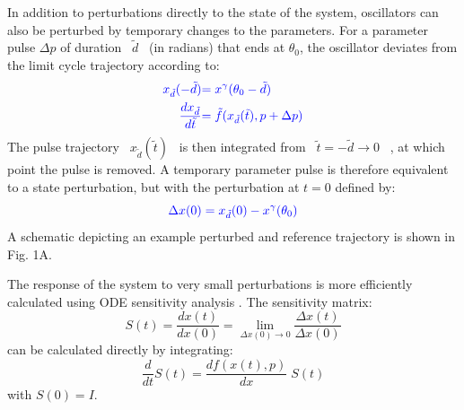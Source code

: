\documentclass[11pt, letterpaper]{article}
\providecommand{\DIFadd}[1]{{\protect\color{blue}#1}} %
\providecommand{\DIFaddbegin}{} %
\providecommand{\DIFaddend}{} %
\begin{document}
In addition to perturbations directly to the state of the system, oscillators can also be perturbed by temporary changes to the parameters.
For a parameter pulse $\Delta p$ of duration \DIFaddbegin \DIFadd{\mbox{%
$\tilde{d}$
}%
}\DIFaddend (in radians) \DIFaddbegin \DIFadd{that }\DIFaddend ends at $\theta_0$, the oscillator deviates from the limit cycle trajectory according to:
\DIFaddbegin \begin{align}\DIFadd{
  x_{\tilde{d}}(-\tilde{d}) }&\DIFadd{= x^\gamma(\theta_0 - \tilde{d}) }\\
  \DIFadd{\frac{dx_{\tilde{d}}}{d\tilde{t}} }&\DIFadd{= \tilde{f}(x_{\tilde{d}}(\tilde{t}), p + \Delta p) \label{eq:ode_pert}
}\end{align}
\DIFaddend The pulse trajectory \DIFaddbegin \DIFadd{\mbox{%
$x_{\tilde{d}}(\tilde{t})$
}%
}\DIFaddend is then integrated from \DIFaddbegin \DIFadd{\mbox{%
$\tilde{t} = -\tilde{d} \to 0$
}%
}\DIFaddend , at which point the pulse is removed.
A temporary parameter pulse is therefore equivalent to a state perturbation, but with the perturbation at $t = 0$ defined by:
\DIFaddbegin \begin{equation}\DIFadd{
  \Delta x(0) = x_{\tilde{d}}(0) - x^\gamma(\theta_0)
}\end{equation}
\DIFaddend A schematic depicting an example perturbed and reference trajectory is shown in Fig. 1A.

The response of the system to very small perturbations is more efficiently calculated using ODE sensitivity analysis \cite{Rabitz1983}.
The sensitivity matrix\DIFaddbegin \DIFadd{:
}\DIFaddend \begin{equation}
  S(t) = \frac{dx(t)}{dx(0)} = \lim_{\Delta x(0) \to 0}\frac{\Delta x(t)}{\Delta x(0)}
  \label{eq:senslimit}
\end{equation}
can be calculated directly by integrating\DIFaddbegin \DIFadd{:
}\DIFaddend \begin{equation}
  \frac{d}{dt} S(t)  = \frac{df(x(t),p)}{dx}\; S(t)
  \label{eq:odesens}
\end{equation}
with $S(0) = I$.
\end{document}
